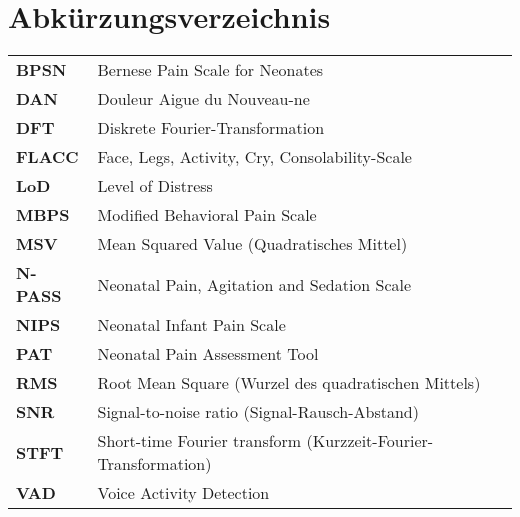 \chapter*{Abkürzungsverzeichnis}




\begin{table}[h]
\begin{tabular}{ll}
\textbf{BPSN}   & Bernese Pain Scale for Neonates                                \\
\textbf{DAN}    & Douleur Aigue du Nouveau-ne                                    \\
\textbf{DFT}    & Diskrete Fourier-Transformation                                \\
\textbf{FLACC}  & Face, Legs, Activity, Cry, Consolability-Scale                 \\
\textbf{LoD}    & Level of Distress                                              \\
\textbf{MBPS}   & Modified Behavioral Pain Scale                                 \\
\textbf{MSV}    & Mean Squared Value (Quadratisches Mittel)                      \\
\textbf{N-PASS} & Neonatal Pain, Agitation and Sedation Scale                    \\
\textbf{NIPS}   & Neonatal Infant Pain Scale                                     \\
\textbf{PAT}    & Neonatal Pain Assessment Tool                                  \\
\textbf{RMS}    & Root Mean Square (Wurzel des quadratischen Mittels)            \\
\textbf{SNR}    & Signal-to-noise ratio (Signal-Rausch-Abstand)                  \\
\textbf{STFT}   & Short-time Fourier transform (Kurzzeit-Fourier-Transformation) \\
\textbf{VAD}    & Voice Activity Detection  
\end{tabular}
\end{table}